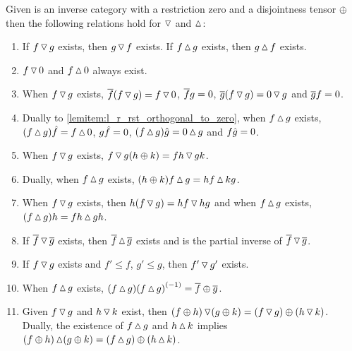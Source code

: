 \begin{lemma}\label{lem:properties_of_tjdown_and_tjup}
  Given \X is an inverse category with a restriction zero and a disjointness tensor $\+$ then the
  following relations hold for $\tjdown$ and $\tjup$:
   \begin{enumerate}[{(}i{)}]
    \item If $f \tjdown g$ exists, then $g \tjdown f$ exists. If $f \tjup g$ exists, then
    $g \tjup f$ exists. \label{lemitem:l_r_commute}
    \item $f \tjdown 0$ and $f \tjup 0$ always exist. \label{lemitem:l_r_zero_exists}
    \item When $f\tjdown g$ exists, $\rst{f}(f\tjdown g) = f \tjdown 0$, $\rst{f}g = 0$,
      $\rst{g}(f \tjdown g) = 0 \tjdown g$ and $\rst{g}f = 0$.
      \label{lemitem:l_r_rst_orthogonal_to_zero}
    \item Dually to \ref{lemitem:l_r_rst_orthogonal_to_zero}, when $f\tjup g$ exists,
      $(f\tjup g)\rg{f} = f \tjup 0$, $g\rg{f} = 0$, $(f \tjup g)\rg{g} = 0 \tjup g$ and
      $f\rg{g} = 0$.\label{lemitem:l_r_rg_orthogonal_to_zero}
    \item When $f\tjdown g$ exists, $f\tjdown g (h\+k) = f h \tjdown g k$.
      \label{lemitem:l_r_l_pull_right}
    \item Dually, when $f \tjup g$ exists, $(h \+ k) f \tjup g = h f \tjup k g$.
      \label{lemitem:l_r_r_pull_left}
    \item When $f \tjdown g$ exists, then $h(f \tjdown g) = h f \tjdown h g$ and when $f \tjup g$
      exists, $(f \tjup g)h = f h \tjup g h$.
      \label{lemitem:l_r_l_universal_r_stable}
    \item If $\rst{f} \tjdown \rst{g}$ exists, then $\rst{f} \tjup \rst{g}$ exists and is
      the partial inverse of $\rst{f} \tjdown \rst{g}$.
      \label{lemitem:l_r_rst_inverses}
    \item If $f\tjdown g$ exists and $f' \le f$, $g' \le g$, then $f' \tjdown g'$ exists.
      \label{lemitem:l_r_less_than}
    \item When $f\tjup g$ exists, $(f\tjup g) \inv{(f\tjup g)} = \rst{f}\+\rst{g}$.
      \label{lemitem:l_r_rst_is_natural}
    \item Given $f\tjdown g$ and $h\tjdown k$ exist, then
      $(f\+h)\tjdown(g\+k) = (f\tjdown g)\+ (h\tjdown k)$. Dually, the existence of $f\tjup g$
      and $h\tjup k$ implies $(f\+h)\tjup(g\+k) = (f\tjup g)\+ (h\tjup k)$.
      \label{lemitem:l_r_preserve_tensor}
  \end{enumerate}
\end{lemma}
